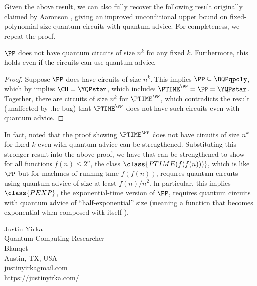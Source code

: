 \documentclass{toc}
\begin{document}
Given the above result, we can also fully recover the following result originally
claimed by Aaronson \cite{aaronson_subtle}, giving an improved unconditional upper bound
on %
fixed-polynomial-size  %
quantum circuits with quantum advice.
For completeness, we repeat the proof.

\begin{theorem}\label{thm:PPcircs}
	$\PP$ does not have quantum circuits of size $n^k$ for any fixed $k$.
	Furthermore, this holds even if the circuits can use quantum advice.
\end{theorem}
\begin{proof}
	Suppose $\PP$ does have circuits of size $n^k$.
	This implies $\PP\subseteq \BQPqpoly$, which by  implies
	$\CH = \YQPstar$, which includes
	$\PTIME^\PP = \PP = \YQPstar$.
	Together, there are circuits of size $n^k$ for $\PTIME^\PP$, which contradicts
	the result \cite[Theorem 4]{aaronson_subtle} (unaffected by the bug)
	that $\PTIME^\PP$ does not have such circuits even with quantum advice.
\end{proof}

In fact, \cite{aaronson_subtle} noted
that the proof showing
$\PTIME^\PP$ does not have circuits of size $n^k$ for fixed $k$
even with quantum advice can be strengthened.
Substituting this stronger result into the above proof,
we have that  can be strengthened to show for all functions
$f(n)\leq 2^n$,
the class $\class{PTIME(f(f(n)))}$,
which is like $\PP$ but for machines of running time $f(f(n))$,
requires quantum circuits using quantum advice of size at least $f(n)/n^2$.
In particular, this implies $\class{PEXP}$, the exponential-time version of $\PP$,
requires quantum circuits with quantum advice of ``half-exponential'' size (meaning
a function that becomes exponential when composed with itself \cite{miltersen1999super}).



%
%


  

%
%
%
%


%
%
%
%
%
\begin{tocauthors}
\begin{tocinfo}[yirka]
 Justin Yirka\\
%
%
%
%
%
 Quantum Computing Researcher\\ %
 Blanqet\\
 Austin, TX, USA\\
 justinyirka\tocat{}gmail.com\\ %
 \url{https://justinyirka.com/}      %
\end{tocinfo}
\end{tocauthors}
\end{document}
